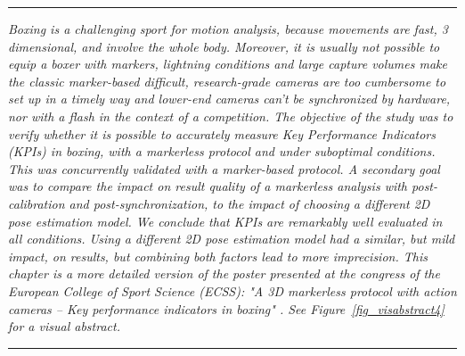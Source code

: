 \begin{center}
\rule{0.7\linewidth}{.5pt}
\begin{minipage}{0.7\linewidth}
\smallskip

\textit{Boxing is a challenging sport for motion analysis, because movements are fast, 3 dimensional, and involve the whole body. Moreover, it is usually not possible to equip a boxer with markers, lightning conditions and large capture volumes make the classic marker-based difficult, research-grade cameras are too cumbersome to set up in a timely way and lower-end cameras can't be synchronized by hardware, nor with a flash in the context of a competition.\newline\newline
The objective of the study was to verify whether it is possible to accurately measure Key Performance Indicators (KPIs) in boxing, with a markerless protocol and under suboptimal conditions. This was concurrently validated with a marker-based protocol. A secondary goal was to compare the impact on result quality of a markerless analysis with post-calibration and post-synchronization, to the impact of choosing a different 2D pose estimation model. We conclude that KPIs are remarkably well evaluated in all conditions. Using a different 2D pose estimation model had a similar, but mild impact, on results, but combining both factors lead to more imprecision.\newline \newline
This chapter is a more detailed version of the poster presented at the congress of the European College of Sport Science (ECSS): "A 3D markerless protocol with action cameras – Key performance indicators in boxing" \cite{Pagnon2022c}. See Figure~\ref{fig_visabstract4} for a visual abstract.
}

\end{minipage}
\smallskip
\rule{0.7\linewidth}{.5pt}
\end{center}

\clearpage

\minitoc

\vspace*{3cm}

